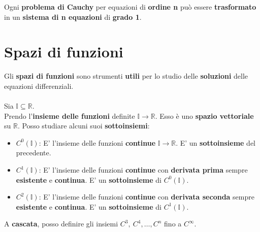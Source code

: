 \documentclass[a4paper, oneside]{article}
\newcommand\R{\mathbb{R}}
\newcommand\I{\mathbb{I}}
\begin{document}
    \noindent Ogni \textbf{problema di Cauchy} per equazioni di \textbf{ordine n} può essere \textbf{trasformato}
    in un \textbf{sistema di n equazioni} di \textbf{grado 1}.

    \newpage

    \section{Spazi di funzioni}
    Gli \textbf{spazi di funzioni} sono strumenti \textbf{utili} per lo studio delle \textbf{soluzioni} delle equazioni differenziali. \\\\
    \noindent Sia $\I\subseteq\R$.\\
    Prendo l'\textbf{insieme delle funzioni} definite $\I\to\R$. Esso è uno \textbf{spazio vettoriale} su $\R$. 
    Posso studiare alcuni suoi \textbf{sottoinsiemi}:
    \begin{itemize}
        \item $C^0(\I)$: E' l'insieme delle funzioni \textbf{continue} $\I\to\R$. E' un \textbf{sottoinsieme} del precedente. 
        \item $C^1(\I)$: E' l'insieme delle funzioni \textbf{continue} con \textbf{derivata prima} sempre \textbf{esistente} e \textbf{continua}. 
        E' un \textbf{sottoinsieme} di $C^0(\I)$.
        \item $C^2(\I)$: E' l'insieme delle funzioni \textbf{continue} con \textbf{derivata seconda} sempre \textbf{esistente} e \textbf{continua}. 
        E' un \textbf{sottoinsieme} di $C^1(\I)$.
    \end{itemize}
    A \textbf{cascata}, posso definire gli insiemi $C^3, \ C^4,\dots,C^n$ fino a $C^{\infty}$.
\end{document}
